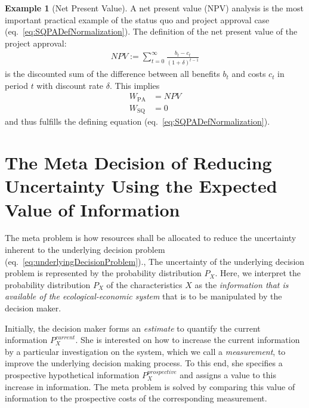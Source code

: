 \documentclass[a4paper,10pt,twoside,pagesize,abstracton]{scrartcl}
\newcommand{\PA}{\mathrm{PA}} %
\newcommand{\SQ}{\mathrm{SQ}} %
\theoremstyle{plain}%
\theoremstyle{definition}
\newtheorem{exmp}[thm]{Example}
\theoremstyle{remark}
\begin{document}
\begin{exmp}[Net Present Value]
  A net present value (NPV) analysis is the most important practical example of the status quo and project approval case (eq.~\ref{eq:SQPADefNormalization}). The definition of the net present value of the project approval:
  \begin{align}
   NPV:=\sum_{t=0}^\infty \frac{b_t - c_t}{(1+\delta)^{t-1}}
  \end{align}
  is the discounted sum of the difference between all benefits $b_t$ and costs $c_t$ in period $t$ with discount rate $\delta$. This implies
  \begin{subequations}
  \begin{align}
   W_\PA &= NPV\\
   W_\SQ &= 0
  \end{align}
  \end{subequations}
    and thus fulfills the defining equation (eq.~\ref{eq:SQPADefNormalization}).
\end{exmp}


\section{The Meta Decision of Reducing Uncertainty Using the Expected Value of Information}
The meta problem is how resources shall be allocated to reduce the uncertainty inherent to the underlying decision problem (eq.~\ref{eq:underlyingDecisionProblem})., The uncertainty of the underlying decision problem is represented by the probability distribution $P_X$. Here, we interpret the probability distribution $P_X$ of the characteristics $X$ as the \emph{information that is available of the ecological-economic system} that is to be manipulated by the decision maker.\par

Initially, the decision maker forms an \emph{estimate} to quantify the current information $P_X^{current}$. She is interested on how to increase the current information by a particular investigation on the system, which we call a \emph{measurement}, to improve the underlying decision making process. To this end, she specifies a prospective hypothetical information $P_X^{prospective}$ and assigns a value to this increase in information. The meta problem is solved by comparing this value of information to the prospective costs of the corresponding measurement.\par
\end{document}
